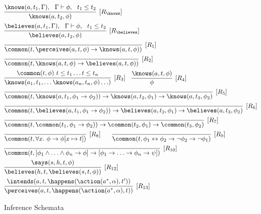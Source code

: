 \begin{figure}[ht!]
\begin{mdframed}[nobreak=true, roundcorner=8pt, frametitlealignment=\centering]
\begin{equation*}
\begin{aligned}
  &\infer[{[R_{\knows}]}]{\knows(a,t_2,\phi)}{\knows(a,t_1,\Gamma), \ 
    \ \Gamma\vdash\phi, \ \ t_1 \leq t_2} \\ 
& \infer[{[R_{\believes}]}]{\believes(a,t_2,\phi)}{\believes(a,t_1,\Gamma), \ 
    \ \Gamma\vdash\phi, \ \ t_1 \leq t_2} \\
 &\infer[{[R_1]}]{\common(t,\perceives(a,t,\phi) \lif\knows(a,t,\phi))}{}\\
&  \infer[{[R_2]}]{\common(t,\knows(a,t,\phi)
    \lif\believes(a,t,\phi))}{}\\
  &\infer[{[R_3]}]{\knows(a_1, t_1, \ldots
    \knows(a_n,t_n,\phi)\ldots)}{\common(t,\phi) \ t\leq t_1 \ldots t\leq
    t_n}\hspace{10pt}
  \infer[{[R_4]}]{\phi}{\knows(a,t,\phi)}\\
  & \infer[{[R_5]}]{\common(t,\knows(a,t_1,\phi_1\lif\phi_2))
    \lif \knows(a,t_2,\phi_1) \lif \knows(a,t_3,\phi_2)}{}\\
& \infer[{[R_6]}]{\common(t,\believes(a,t_1,\phi_1\lif\phi_2))
    \lif \believes(a,t_2,\phi_1) \lif \believes(a,t_3,\phi_2)}{}\\
& \infer[{[R_7]}]{\common(t,\common(t_1,\phi_1\lif\phi_2))
    \lif \common(t_2,\phi_1) \lif \common(t_3,\phi_2)}{} \\
& \infer[{[R_8]}]{\common(t, \forall x. \  \phi \lif \phi[x\mapsto
  t])}{} \hspace{18pt}
  \infer[{[R_9]}]{\common(t,\phi_1 \liff \phi_2 \lif \neg
    \phi_2 \lif \neg \phi_1)}{}\\
& \infer[{[R_{10}]}] {\common(t,[\phi_1\land\ldots\land\phi_n\lif\phi]
  \lif [\phi_1\lif\ldots\lif\phi_n\lif\psi])}{}\\
&\infer[{[R_{12}]}]{\believes(h,t,\believes(s,t,\phi))}{\says(s,h,t,\phi)}
\\ &\infer[{[R_{13}]}]{\perceives(a,t,\happens(\action(a^\ast,\alpha),t))}{\intends(a,t,\happens(\action(a^\ast,\alpha),t'))}
\end{aligned}
\end{equation*}
\end{mdframed}
\caption{\CEC Inference Schemata}
\label{infschem}
\end{figure}

